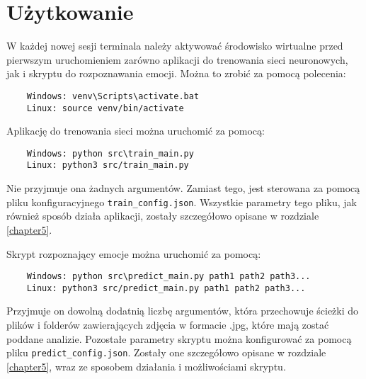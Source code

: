 \section{Użytkowanie}
W każdej nowej sesji terminala należy aktywować środowisko wirtualne przed pierwszym uruchomieniem zarówno aplikacji do trenowania sieci neuronowych, jak i skryptu do rozpoznawania emocji. Można to zrobić za pomocą polecenia:
\begin{verbatim}
    Windows: venv\Scripts\activate.bat
    Linux: source venv/bin/activate
\end{verbatim}

Aplikację do trenowania sieci można uruchomić za pomocą:
\begin{verbatim}
    Windows: python src\train_main.py
    Linux: python3 src/train_main.py
\end{verbatim}
Nie przyjmuje ona żadnych argumentów. Zamiast tego, jest sterowana za pomocą pliku konfiguracyjnego 
\verb|train_config.json|. Wszystkie parametry tego pliku, jak również sposób działa aplikacji, zostały szczegółowo opisane w rozdziale \ref{chapter5}.

Skrypt rozpoznający emocje można uruchomić za pomocą:
\begin{verbatim}
    Windows: python src\predict_main.py path1 path2 path3...
    Linux: python3 src/predict_main.py path1 path2 path3...
\end{verbatim}
Przyjmuje on dowolną dodatnią liczbę argumentów, która przechowuje ścieżki do plików i folderów zawierających zdjęcia w formacie .jpg, które mają zostać poddane analizie. Pozostałe parametry skryptu można konfigurować za pomocą pliku \verb|predict_config.json|. Zostały one szczegółowo opisane w rozdziale \ref{chapter5}, wraz ze sposobem działania i możliwościami skryptu.
